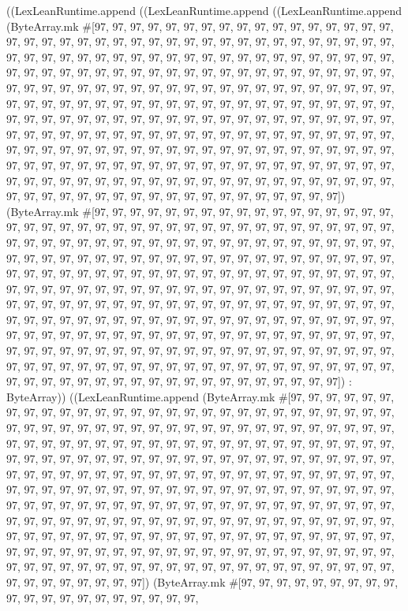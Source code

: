 \documentclass[11pt]{article}
\begin{document}
((LexLeanRuntime.append ((LexLeanRuntime.append ((LexLeanRuntime.append (ByteArray.mk \#[97, 97, 97, 97, 97, 97, 97, 97, 97, 97, 97, 97, 97, 97, 97, 97, 97, 97, 97, 97, 97, 97, 97, 97, 97, 97, 97, 97, 97, 97, 97, 97, 97, 97, 97, 97, 97, 97, 97, 97, 97, 97, 97, 97, 97, 97, 97, 97, 97, 97, 97, 97, 97, 97, 97, 97, 97, 97, 97, 97, 97, 97, 97, 97, 97, 97, 97, 97, 97, 97, 97, 97, 97, 97, 97, 97, 97, 97, 97, 97, 97, 97, 97, 97, 97, 97, 97, 97, 97, 97, 97, 97, 97, 97, 97, 97, 97, 97, 97, 97, 97, 97, 97, 97, 97, 97, 97, 97, 97, 97, 97, 97, 97, 97, 97, 97, 97, 97, 97, 97, 97, 97, 97, 97, 97, 97, 97, 97, 97, 97, 97, 97, 97, 97, 97, 97, 97, 97, 97, 97, 97, 97, 97, 97, 97, 97, 97, 97, 97, 97, 97, 97, 97, 97, 97, 97, 97, 97, 97, 97, 97, 97, 97, 97, 97, 97, 97, 97, 97, 97, 97, 97, 97, 97, 97, 97, 97, 97, 97, 97, 97, 97, 97, 97, 97, 97, 97, 97, 97, 97, 97, 97, 97, 97, 97, 97, 97, 97, 97, 97, 97, 97, 97, 97, 97, 97, 97, 97, 97, 97, 97, 97, 97, 97, 97, 97, 97, 97, 97, 97, 97, 97, 97, 97, 97, 97, 97, 97, 97, 97, 97, 97, 97, 97, 97, 97, 97, 97, 97, 97, 97, 97, 97, 97, 97, 97, 97, 97, 97, 97, 97, 97, 97, 97, 97, 97]) (ByteArray.mk \#[97, 97, 97, 97, 97, 97, 97, 97, 97, 97, 97, 97, 97, 97, 97, 97, 97, 97, 97, 97, 97, 97, 97, 97, 97, 97, 97, 97, 97, 97, 97, 97, 97, 97, 97, 97, 97, 97, 97, 97, 97, 97, 97, 97, 97, 97, 97, 97, 97, 97, 97, 97, 97, 97, 97, 97, 97, 97, 97, 97, 97, 97, 97, 97, 97, 97, 97, 97, 97, 97, 97, 97, 97, 97, 97, 97, 97, 97, 97, 97, 97, 97, 97, 97, 97, 97, 97, 97, 97, 97, 97, 97, 97, 97, 97, 97, 97, 97, 97, 97, 97, 97, 97, 97, 97, 97, 97, 97, 97, 97, 97, 97, 97, 97, 97, 97, 97, 97, 97, 97, 97, 97, 97, 97, 97, 97, 97, 97, 97, 97, 97, 97, 97, 97, 97, 97, 97, 97, 97, 97, 97, 97, 97, 97, 97, 97, 97, 97, 97, 97, 97, 97, 97, 97, 97, 97, 97, 97, 97, 97, 97, 97, 97, 97, 97, 97, 97, 97, 97, 97, 97, 97, 97, 97, 97, 97, 97, 97, 97, 97, 97, 97, 97, 97, 97, 97, 97, 97, 97, 97, 97, 97, 97, 97, 97, 97, 97, 97, 97, 97, 97, 97, 97, 97, 97, 97, 97, 97, 97, 97, 97, 97, 97, 97, 97, 97, 97, 97, 97, 97, 97, 97, 97, 97, 97, 97, 97, 97, 97, 97, 97, 97, 97, 97, 97, 97, 97, 97, 97, 97, 97, 97, 97, 97, 97, 97, 97, 97, 97, 97, 97, 97, 97, 97, 97, 97]) : ByteArray)) ((LexLeanRuntime.append (ByteArray.mk \#[97, 97, 97, 97, 97, 97, 97, 97, 97, 97, 97, 97, 97, 97, 97, 97, 97, 97, 97, 97, 97, 97, 97, 97, 97, 97, 97, 97, 97, 97, 97, 97, 97, 97, 97, 97, 97, 97, 97, 97, 97, 97, 97, 97, 97, 97, 97, 97, 97, 97, 97, 97, 97, 97, 97, 97, 97, 97, 97, 97, 97, 97, 97, 97, 97, 97, 97, 97, 97, 97, 97, 97, 97, 97, 97, 97, 97, 97, 97, 97, 97, 97, 97, 97, 97, 97, 97, 97, 97, 97, 97, 97, 97, 97, 97, 97, 97, 97, 97, 97, 97, 97, 97, 97, 97, 97, 97, 97, 97, 97, 97, 97, 97, 97, 97, 97, 97, 97, 97, 97, 97, 97, 97, 97, 97, 97, 97, 97, 97, 97, 97, 97, 97, 97, 97, 97, 97, 97, 97, 97, 97, 97, 97, 97, 97, 97, 97, 97, 97, 97, 97, 97, 97, 97, 97, 97, 97, 97, 97, 97, 97, 97, 97, 97, 97, 97, 97, 97, 97, 97, 97, 97, 97, 97, 97, 97, 97, 97, 97, 97, 97, 97, 97, 97, 97, 97, 97, 97, 97, 97, 97, 97, 97, 97, 97, 97, 97, 97, 97, 97, 97, 97, 97, 97, 97, 97, 97, 97, 97, 97, 97, 97, 97, 97, 97, 97, 97, 97, 97, 97, 97, 97, 97, 97, 97, 97, 97, 97, 97, 97, 97, 97, 97, 97, 97, 97, 97, 97, 97, 97, 97, 97, 97, 97, 97, 97, 97, 97, 97, 97, 97, 97, 97, 97, 97, 97]) (ByteArray.mk \#[97, 97, 97, 97, 97, 97, 97, 97, 97, 97, 97, 97, 97, 97, 97, 97, 97, 97, 97, 97, 
\end{document}
